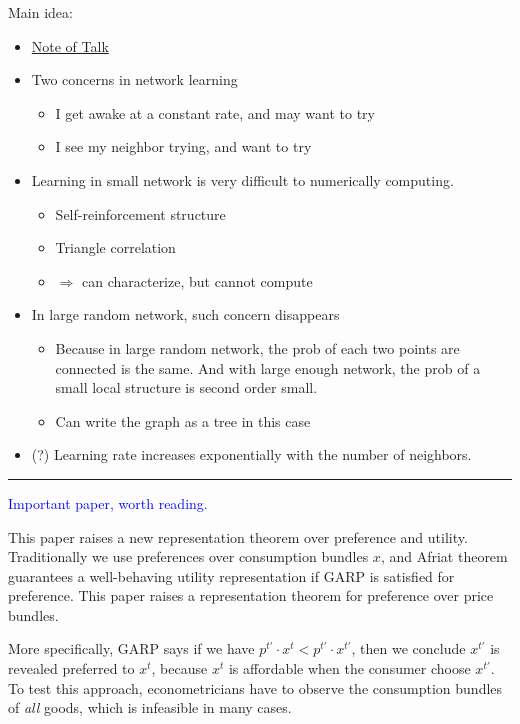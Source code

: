 \documentclass{book}
\theoremstyle{plain}
\theoremstyle{definition}
\begin{document}
\noindent
Main idea: 
\begin{itemize}
	\item \href{run:resources/learning/Talk_note_Learning in network.pdf}{Note of Talk}
	\item Two concerns in network learning
	\begin{itemize}
		\item I get awake at a constant rate, and may want to try
		\item I see my neighbor trying, and want to try
	\end{itemize}
	\item Learning in small network is very difficult to numerically computing.
	\begin{itemize}
		\item Self-reinforcement structure
		\item Triangle correlation
		\item $\Rightarrow$ can characterize, but cannot compute
	\end{itemize}
	\item In large random network, such concern disappears
	\begin{itemize}
		\item Because in large random network, the prob of each two points are connected is the same.
		And with large enough network, the prob of a small local structure is second order small. 
		\item Can write the graph as a tree in this case
	\end{itemize}
	\item (?) Learning rate increases exponentially with the number of neighbors.
\end{itemize}




\vspace{3mm}
\hrule
\vspace{3mm}

\noindent
\textbf{}

\textcolor{blue}{Important paper, worth reading.}

This paper raises a new representation theorem over preference and utility. 
Traditionally we use preferences over consumption bundles $x$, 
and Afriat theorem guarantees a well-behaving utility representation if GARP is satisfied for preference.
This paper raises a representation theorem for preference over price bundles.

More specifically, GARP says if we have $p^{t'}\cdot x^t<p^{t'}\cdot x^{t'}$,
then we conclude $x^{t'}$ is revealed preferred to $x^t$, because $x^t$ is affordable when the consumer choose $x^{t'}$.
To test this approach, econometricians have to observe the consumption bundles of \textit{all} goods, which is infeasible in many cases.
\end{document}
